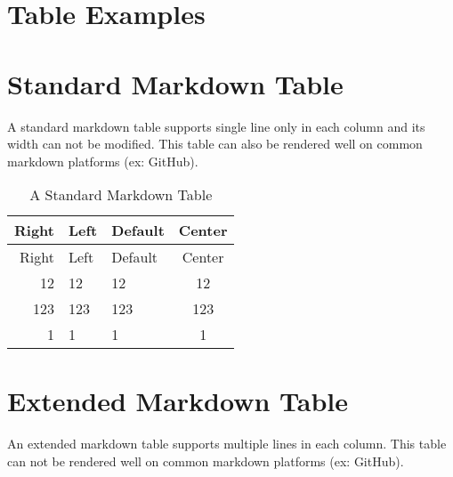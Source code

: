 \documentclass[10pt, a4paper, oneside]{article}
\begin{document}
\section*{Table Examples}\label{table-examples}

\section{Standard Markdown Table}\label{standard-markdown-table}

A standard markdown table supports single line only in each column and its width can not be modified.
This table can also be rendered well on common markdown platforms (ex: GitHub).

\begin{longtable}[c]{@{}rllc@{}}
\caption{A Standard Markdown Table}\tabularnewline
\toprule
Right & Left & Default & Center\tabularnewline
\midrule
\endfirsthead
\toprule
Right & Left & Default & Center\tabularnewline
\midrule
\endhead
12 & 12 & 12 & 12\tabularnewline
123 & 123 & 123 & 123\tabularnewline
1 & 1 & 1 & 1\tabularnewline
\bottomrule
\end{longtable}

\section{Extended Markdown Table}\label{extended-markdown-table}

An extended markdown table supports multiple lines in each column.
This table can not be rendered well on common markdown platforms (ex: GitHub).
\end{document}
